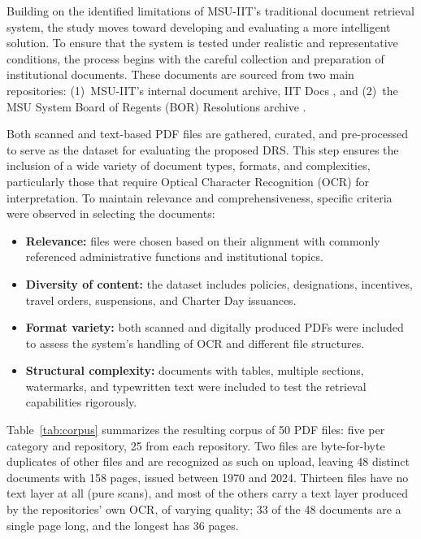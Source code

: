 Building on the identified limitations of MSU-IIT's traditional document retrieval system, the study moves toward developing and evaluating a more intelligent solution. To ensure that the system is tested under realistic and representative conditions, the process begins with the careful collection and preparation of institutional documents. These documents are sourced from two main repositories: (1)~MSU-IIT's internal document archive, IIT Docs \citep{msuiitdocs}, and (2)~the MSU System Board of Regents (BOR) Resolutions archive \citep{msuiitbor}.

Both scanned and text-based PDF files are gathered, curated, and pre-processed to serve as the dataset for evaluating the proposed DRS. This step ensures the inclusion of a wide variety of document types, formats, and complexities, particularly those that require Optical Character Recognition (OCR) for interpretation. To maintain relevance and comprehensiveness, specific criteria were observed in selecting the documents:

\begin{itemize}
  \item \textbf{Relevance:} files were chosen based on their alignment with commonly referenced administrative functions and institutional topics.
  \item \textbf{Diversity of content:} the dataset includes policies, designations, incentives, travel orders, suspensions, and Charter Day issuances.
  \item \textbf{Format variety:} both scanned and digitally produced PDFs were included to assess the system's handling of OCR and different file structures.
  \item \textbf{Structural complexity:} documents with tables, multiple sections, watermarks, and typewritten text were included to test the retrieval capabilities rigorously.
\end{itemize}

Table~\ref{tab:corpus} summarizes the resulting corpus of 50 PDF files: five per category and repository, 25 from each repository. Two files are byte-for-byte duplicates of other files and are recognized as such on upload, leaving 48 distinct documents with 158 pages, issued between 1970 and 2024. Thirteen files have no text layer at all (pure scans), and most of the others carry a text layer produced by the repositories' own OCR, of varying quality; 33 of the 48 documents are a single page long, and the longest has 36 pages.

